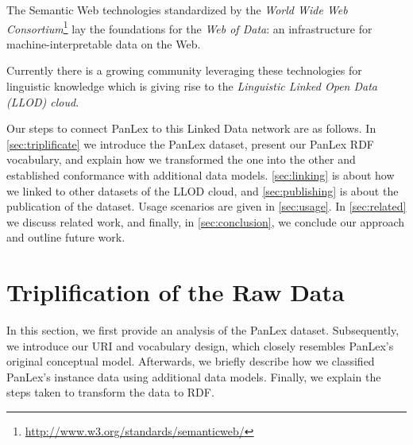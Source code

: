 \documentclass[sw]{iosart2c}
\begin{document}

The Semantic Web technologies
standardized by the
\emph{World Wide Web Consortium}\footnote{\url{http://www.w3.org/standards/semanticweb/}}
lay the foundations for the \emph{Web of Data}: an infrastructure for
machine-interpretable data on the Web.


Currently there is a growing community leveraging
these
technologies for linguistic knowledge which is giving rise to the \emph{Linguistic Linked Open Data (LLOD) cloud}.


Our steps to connect PanLex to this Linked Data network are as follows.
In \autoref{sec:triplificate} we introduce the PanLex dataset, present our
PanLex RDF vocabulary, and explain how we transformed the one into the other and established conformance with additional data models.
\autoref{sec:linking} is about how we linked to other datasets of the LLOD cloud,
and \autoref{sec:publishing} is about the publication of the dataset.
Usage scenarios are given in \autoref{sec:usage}.
In \autoref{sec:related} we discuss related work, and finally, in \autoref{sec:conclusion}, we conclude our approach and outline future work.

\section{Triplification of the Raw Data}
\label{sec:triplificate}
In this section, we first provide an analysis of the PanLex dataset.
Subsequently, we introduce our URI and vocabulary design, which closely
resembles PanLex's original conceptual model.
Afterwards, we briefly describe how we classified PanLex's
instance data using additional data models. Finally, we explain the steps
taken to transform the data to RDF.
\end{document}
